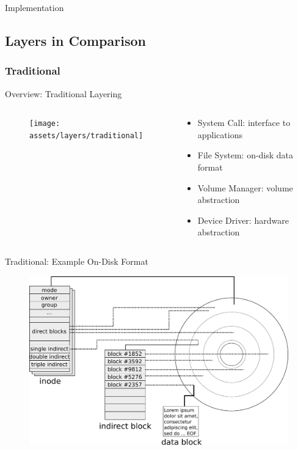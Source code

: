 \begin{frame}
	\begin{center}
		\Huge Implementation
	\end{center}
\end{frame}

\subsection{Layers in Comparison}
\subsubsection{Traditional}
\begin{frame}[label=overview_traditional_layering]{Overview: Traditional Layering}
	\begin{columns}[c]
		\begin{column}{0.4\textwidth}
			\begin{figure}
				\centering
				\texttt{[image: assets/layers/traditional]}
			\end{figure}
		\end{column}
		\pause
		\begin{column}{0.4\textwidth}
			\begin{itemize}
				\item<5-> System Call: interface to applications
				\item<4-> File System: on-disk data format %
				\item<3-> Volume Manager: volume abstraction
				\item<2-> Device Driver: hardware abstraction
			\end{itemize}
		\end{column}
	\end{columns}
\end{frame}

\begin{frame}{Traditional: Example On-Disk Format}
	\begin{figure}
	\centering
	\includegraphics[height=0.75\textheight]{assets/traditional_fs}
	\end{figure}
\end{frame}

